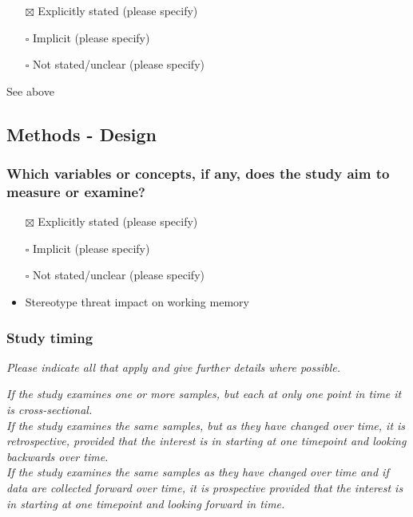 \documentclass[
  doc, a4paper]{apa7}
\providecommand{\tightlist}{%
  \setlength{\itemsep}{0pt}\setlength{\parskip}{0pt}}
\begin{document}
\begin{itemize}
\tightlist
\item[$\boxtimes$]
  Explicitly stated (please specify)\\
\item[$\square$]
  Implicit (please specify)\\
\item[$\square$]
  Not stated/unclear (please specify)
\end{itemize}

See above

\subsection{Methods - Design}\label{methods---design}

\subsubsection{Which variables or concepts, if any, does the study aim to measure or examine?}\label{which-variables-or-concepts-if-any-does-the-study-aim-to-measure-or-examine}

\begin{itemize}
\item[$\boxtimes$]
  Explicitly stated (please specify)\\
\item[$\square$]
  Implicit (please specify)\\
\item[$\square$]
  Not stated/unclear (please specify)
\item
  Stereotype threat impact on working memory
\end{itemize}

\subsubsection{Study timing}\label{study-timing}

\emph{Please indicate all that apply and give further details where possible.}

\emph{If the study examines one or more samples, but each at only one point in time it is cross-sectional.}\\
\emph{If the study examines the same samples, but as they have changed over time, it is retrospective, provided that the interest is in starting at one timepoint and looking backwards over time.}\\
\emph{If the study examines the same samples as they have changed over time and if data are collected forward over time, it is prospective provided that the interest is in starting at one timepoint and looking forward in time.}
\end{document}
